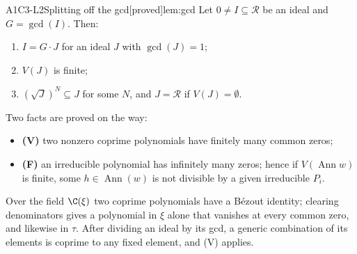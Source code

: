 \documentclass[11pt,a4paper,oneside]{report}
\newcommand{\badge}[2]{\textcolor{#1}{\textsf{\footnotesize[#2]}}}
\newcommand{\proved}{\badge{cC}{proved}}
\newcommand{\Ann}{\operatorname{Ann}}
\newcommand{\ring}{\mathcal{R}}
\newcommand{\Var}{V}
\DeclareMathOperator{\Gcd}{gcd}
\newenvironment{dimcard}[5]{\par\Needspace{12\baselineskip}\begin{dimcardbox}{#1}{#2}{#3}{#4}{#5}}{\end{dimcardbox}}
\begin{document}
\begin{dimcard}{A1}{C3-L2}{Splitting off the gcd}{\proved}{lem:gcd}
Let $0\ne I\subseteq\ring$ be an ideal and $G=\Gcd(I)$. Then:
\begin{enumerate}[label=(\roman*)]
\item $I=G\cdot J$ for an ideal $J$ with $\Gcd(J)=1$;
\item $\Var(J)$ is finite;
\item $(\sqrt J)^N\subseteq J$ for some $N$, and $J=\ring$ if $\Var(J)=\emptyset$.
\end{enumerate}
Two facts are proved on the way:
\begin{itemize}
\item \textbf{(V)} two nonzero coprime polynomials have finitely many common zeros;
\item \textbf{(F)} an irreducible polynomial has infinitely many zeros; hence if $\Var(\Ann w)$ is finite, some $h\in\Ann(w)$ is not divisible by a given irreducible $P_i$.
\end{itemize}
\end{dimcard}

\begin{proofidea}
Over the field $\C(\xi)$ two coprime polynomials have a B\'ezout identity; clearing denominators gives a polynomial in $\xi$ alone that vanishes at every common zero, and likewise in $\tau$. After dividing an ideal by its gcd, a generic combination of its elements is coprime to any fixed element, and (V) applies.
\end{proofidea}
\end{document}
